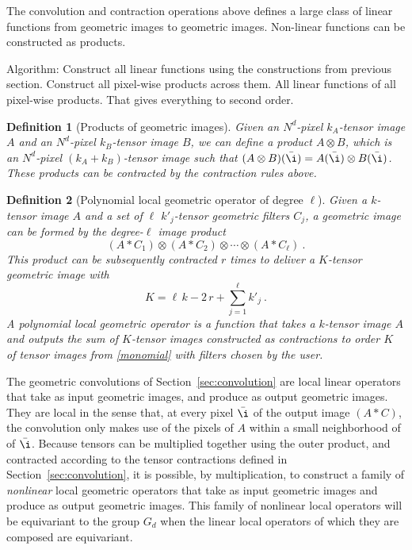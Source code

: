 \documentclass{article}
\theoremstyle{plain}
\newtheorem{definition}{Definition}
\newcommand{\sectionname}{Section}
\newcommand{\secref}[1]{\sectionname~\ref{#1}}
\begin{document}
The convolution and contraction operations above defines a large class of linear functions from geometric images to geometric images. Non-linear functions can be constructed as products.

Algorithm: \newline
Construct all linear functions using the constructions from previous section. \newline
Construct all pixel-wise products across them. \newline
All linear functions of all pixel-wise products. \newline
That gives everything to second order. \newline

\begin{definition}[Products of geometric images]
Given an $N^d$-pixel $k_A$-tensor image $A$ and an $N^d$-pixel $k_B$-tensor image $B$, we can define a product $A\otimes B$, which is an $N^d$-pixel $(k_A+k_B)$-tensor image such that $(A\otimes B)(\bar\i)=A(\bar\i)\otimes B(\bar\i)$. These products can be contracted by the contraction rules above.
\end{definition}

\begin{definition}[Polynomial local geometric operator of degree $\ell$]
Given a $k$-tensor image $A$ and a set of $\ell$ $k'_j$-tensor geometric filters $C_j$, a geometric image can be formed by the degree-$\ell$ image product
\begin{equation}
    (A\ast C_1) \otimes (A\ast C_2) \otimes \cdots \otimes (A\ast C_\ell) ~. \label{monomial}
\end{equation}
This product can be subsequently contracted $r$ times to deliver a $K$-tensor geometric image with
\begin{equation}
    K = \ell\,k - 2\,r + \sum_{j=1}^\ell k'_j ~.
\end{equation}
A polynomial local geometric operator is a function that takes a $k$-tensor image $A$ and outputs the sum of $K$-tensor images constructed as contractions to order $K$ of tensor images from \eqref{monomial} with filters chosen by the user. 
\end{definition}

The geometric convolutions of \secref{sec:convolution} are local linear operators that take as input geometric images, and produce as output geometric images.
They are local in the sense that, at every pixel $\bar\i$ of the output image $(A\ast C)$, the convolution only makes use of the pixels of $A$ within a small neighborhood of of $\bar\i$.
Because tensors can be multiplied together using the outer product, and contracted according to the tensor contractions defined in \secref{sec:convolution}, it is possible, by multiplication, to construct a family of \emph{nonlinear} local geometric operators that take as input geometric images and produce as output geometric images.
This family of nonlinear local operators will be equivariant to the group $G_d$ when the linear local operators of which they are composed are equivariant.
\end{document}
